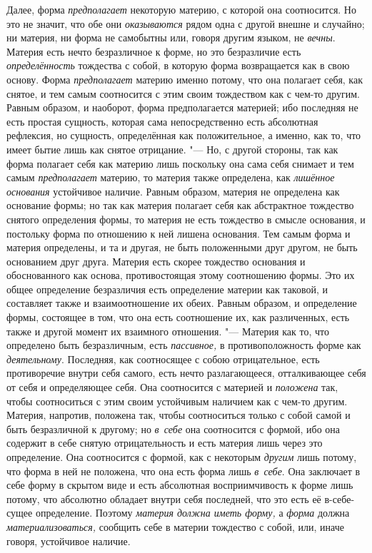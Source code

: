 Далее, форма {\em предполагает} некоторую материю, с
которой она соотносится. Но это не значит, что обе они
{\em оказываются} рядом одна с другой внешне и
случайно; ни материя, ни форма не самобытны или, говоря другим языком, не
{\em вечны}. Материя есть нечто безразличное к форме,
но это безразличие есть {\em определённость} тождества
с собой, в которую форма возвращается как в свою основу. Форма
{\em предполагает} материю именно потому, что она
полагает себя, как снятое, и тем самым соотносится с этим своим тождеством
как с чем-то другим. Равным образом, и наоборот, форма предполагается
материей; ибо последняя не есть простая сущность, которая сама
непосредственно есть абсолютная рефлексия, но сущность, определённая как
положительное, а именно, как то, что имеет бытие лишь как снятое отрицание.
"--- Но, с другой стороны, так как форма полагает себя как материю лишь
поскольку она сама себя снимает и тем самым
{\em предполагает} материю, то материя также
определена, как {\em лишённое основания} устойчивое
наличие. Равным образом, материя не определена как основание формы; но так
как материя полагает себя как абстрактное тождество снятого определения
формы, то материя не есть тождество в смысле основания, и постольку форма
по отношению к ней лишена основания. Тем самым форма и материя определены,
и та и другая, не быть положенными друг другом, не быть основанием друг
друга. Материя есть скорее тождество основания и обоснованного как основа,
противостоящая этому соотношению формы. Это их общее определение
безразличия есть определение материи как таковой, и составляет также и
взаимоотношение их обеих. Равным образом, и определение формы, состоящее в
том, что она есть соотношение их, как различенных, есть также и другой
момент их взаимного отношения. "--- Материя как то, что определено быть
безразличным, есть {\em пассивное,} в противоположность
форме как {\em деятельному}. Последняя, как соотносящее
с собою отрицательное, есть противоречие внутри себя самого, есть нечто
разлагающееся, отталкивающее себя от себя и определяющее себя. Она
соотносится с материей и {\em положена} так, чтобы
соотноситься с этим своим устойчивым наличием как с чем-то другим. Материя,
напротив, положена так, чтобы соотноситься только с собой самой и быть
безразличной к другому; но {\em в~себе} она соотносится
с формой, ибо она содержит в себе снятую отрицательность и есть материя
лишь через это определение. Она соотносится с формой, как с некоторым
{\em другим} лишь потому, что форма в ней не положена,
что она есть форма лишь {\em в~себе}. Она заключает в
себе форму в скрытом виде и есть абсолютная восприимчивость к форме лишь
потому, что абсолютно обладает внутри себя последней, что это есть её
в-себе-сущее определение. Поэтому {\em материя должна
иметь форму,} а {\em форма} должна
{\em материализоваться,} сообщить себе в материи
тождество с собой, или, иначе говоря, устойчивое наличие.

